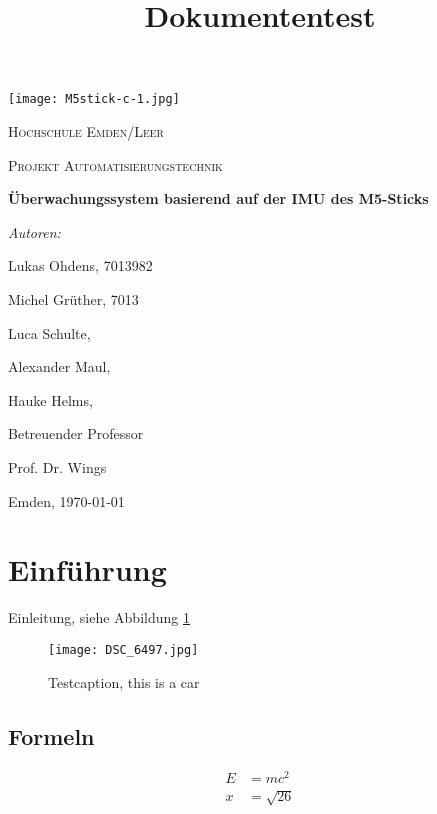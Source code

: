 \documentclass[a4paper,12pt]{article}
\title{Dokumententest}
\begin{document}
\begin{titlepage}
	\centering
	\texttt{[image: M5stick-c-1.jpg]}\par\vspace{1cm}
	{\scshape\LARGE Hochschule Emden/Leer \par}
	\vspace{1cm}
	{\scshape\Large Projekt Automatisierungstechnik\par}
	\vspace{1.5cm}
	{\huge\bfseries Überwachungssystem basierend
	auf der IMU des
	M5-Sticks\par}
	\vspace{2cm}
	{\Large\itshape Autoren:\par {Lukas Ohdens, 7013982\par
	Michel Grüther, 7013\par Luca Schulte, \par Alexander
	Maul, \par Hauke Helms, }\par}
	\vfill
	Betreuender Professor\par
	Prof. Dr. Wings

	\vfill

	{\large Emden, \today\par}
\end{titlepage}

\tableofcontents
\newpage


\section{Einführung}
Einleitung, siehe Abbildung \ref{Golf}\par

\begin{figure}[h]	%
\begin{center}
\texttt{[image: DSC\_6497.jpg]}
\caption{Testcaption, this is a car}
\label{Golf}
\end{center}
\end{figure}

\subsection{Formeln}

\begin{align}
E &= mc^2	\\
x &= \sqrt{26}
\end{align}
\end{document}
